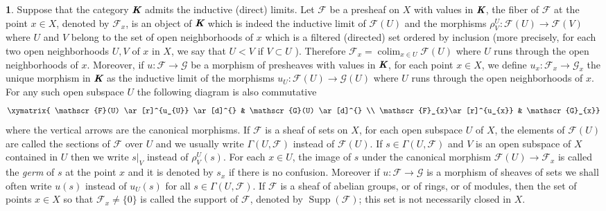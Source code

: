 \documentclass[12pt]{amsart}
\newcommand{\colimit}{\operatorname{colim}}
\newcommand{\Supp}{\operatorname{Supp}}
\theoremstyle{definition}
\newtheorem{bk}[proposition]{}
\begin{document}
\begin{bk}\label{I: 3.1.6} Suppose that the category  $\emph{\textbf{K}}$ admits the inductive (direct) limits. Let $\mathscr{F}$ be a presheaf on $X$ with values in $\emph{\textbf{K}}$, the fiber of  $\mathscr{F}$ at the point $x\in X$, denoted by $\mathscr{F}_{x}$, is an object of $\emph{\textbf{K}}$ which is indeed the inductive limit of  $\mathscr{F}(U)$ and the morphisms $\rho_{V}^{U}: \mathscr{F}(U)\rightarrow\mathscr{F}(V)$ where $U$ and $V$ belong to the set of open neighborhoods of $x$ which is a filtered (directed) set ordered by inclusion (more precisely, for each two open neighborhoods $U,V$ of $x$ in $X$, we say that $U< V$ if $V\subset U$ ). Therefore $\mathscr{F}_{x}=\colimit_{x\in U}\mathscr{F}(U)$ where $U$ runs through the open neighborhoods of $x$. Moreover, if $u: \mathscr{F}\rightarrow\mathscr{G}$ be a morphism of presheaves with values in $\emph{\textbf{K}}$, for each point $x\in X$, we define $u_{x}:\mathscr{F}_{x}\rightarrow\mathscr{G}_{x}$ the unique morphism in $\emph{\textbf{K}}$ as the inductive limit of the morphisms $u_{U}: \mathscr{F}(U)\rightarrow\mathscr{G}(U)$ where $U$ runs through the open neighborhoods of $x$. For any such open subspace $U$ the following diagram is also commutative $$\xymatrix{
\mathscr{F}(U) \ar[r]^{u_{U}} \ar[d]^{} & \mathscr{G}(U) \ar[d]^{} \\ \mathscr{F}_{x}\ar[r]^{u_{x}} & \mathscr{G}_{x}} $$ where the vertical arrows are the canonical morphisms.
If $\mathscr{F}$ is a sheaf of sets on $X$, for each open subspace $U$ of $X$, the elements of $\mathscr{F}(U)$ are called the sections of $\mathscr{F}$ over $U$ and we usually write $\Gamma(U, \mathscr{F})$ instead of $\mathscr{F}(U)$. If $s\in\Gamma(U, \mathscr{F})$ and $V$ is an open subspace of $X$ contained in $U$ then we write $s|_{V}$ instead of $\rho_{V}^{U}(s)$. For each $x\in U$, the image of $s$ under the canonical morphism $\mathscr{F}(U)\rightarrow\mathscr{F}_{x}$ is called the \emph{germ} of $s$ at the point $x$ and it is denoted by $s_{x}$ if there is no confusion. Moreover if $u:\mathscr{F}\rightarrow\mathscr{G}$ is a morphism of sheaves of sets we shall often write $u(s)$ instead of $u_{U}(s)$ for all $s\in\Gamma(U, \mathscr{F})$. If $\mathscr{F}$ is a sheaf of abelian groups, or of rings, or of modules, then the set of points $x\in X$ so that $\mathscr{F}_{x}\neq\{0\}$ is called the support of  $\mathscr{F}$, denoted by $\Supp(\mathscr{F})$; this set is not necessarily closed in $X$.\\
\end{bk}
\end{document}
